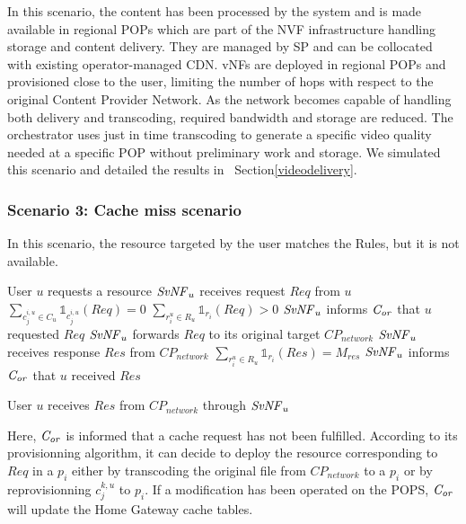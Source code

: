 In this scenario, the content has been processed by the system and is made available in regional POPs which are part of the NVF infrastructure handling storage and content delivery.
They are managed by SP and can be collocated with existing operator-managed CDN.
vNFs are deployed in regional POPs and provisioned close to the user, limiting the number of hops with respect to the original Content Provider Network.
As the network becomes capable of handling both delivery and transcoding, required bandwidth and storage are reduced. The orchestrator uses just in time transcoding to generate a specific video quality needed at a specific POP without preliminary work and storage.
We simulated this scenario and detailed the results in ~Section\ref{videodelivery}.

\subsubsection*{Scenario 3: Cache miss scenario}

In this scenario, the resource targeted by the user matches the Rules, but it is not available.

\begin{algorithmic}[1]
\STATE User $u$ requests a resource
\STATE $\mathit{SvNF}_{u}$ receives request $\mathit{Req}$ from $u$
\STATE \( \sum_{c^{i,u}_{j}\in C_{u}}{\mathbb{1}_{c^{i,u}_{j}}(\mathit{Req})} = 0 \)
\STATE \( \sum_{r^{u}_{i}\in R_{u}}{\mathbb{1}_{r_{i}}(\mathit{Req})} > 0  \)
\STATE $\mathit{SvNF}_{u}$ informs $\mathit{C_{or}}$ that $u$ requested $\mathit{Req}$
\ENDIF
\STATE $\mathit{SvNF}_{u}$ forwards $\mathit{Req}$ to its original target \(\mathit{CP}_{\mathit{network}}\)
\STATE $\mathit{SvNF}_{u}$ receives response $\mathit{Res}$ from \(\mathit{CP}_{\mathit{network}}\)
	\STATE \( \sum_{r^{u}_{i}\in R_{u}}{\mathbb{1}_{r_{i}}(\mathit{Res})}=M_{res}\) 
	\STATE $\mathit{SvNF}_{u}$ informs $\mathit{C_{or}}$ that $u$ received $\mathit{Res}$
	\ENDIF
\ENDIF

 
\STATE User $u$ receives $\mathit{Res}$ from \(\mathit{CP}_{\mathit{network}}\) through $\mathit{SvNF}_{u}$
\end{algorithmic}

Here, $\mathit{C_{or}}$ is informed that a cache request has not been fulfilled. According to its provisionning algorithm, it can decide to deploy the resource corresponding to $\mathit{Req}$ in a $p_{i}$ either by transcoding the original file from \(\mathit{CP}_{\mathit{network}}\) to a $p_{i}$ or by reprovisionning $c^{k,u}_{j}$ to $p_{i}$.
If a modification has been operated on the POPS, $\mathit{C_{or}}$ will update the Home Gateway cache tables.

